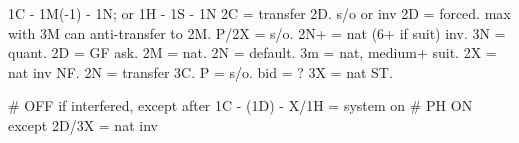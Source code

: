 1C - 1M(-1) - 1N; or 1H - 1S - 1N
2C = transfer 2D. s/o or inv
    2D = forced. max with 3M can anti-transfer to 2M.
        P/2X = s/o. 2N+ = nat (6+ if suit) inv. 3N = quant.
2D = GF ask.
    2M = nat. 2N = default. 3m = nat, medium+ suit.
2X = nat inv NF.
2N = transfer 3C.
    P = s/o. bid = ?
3X = nat ST.

# OFF if interfered, except after 1C - (1D) - X/1H = system on
# PH ON except 2D/3X = nat inv